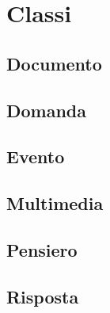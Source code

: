 \chapter{Classi}\label{ch:contenuti:classi}
\section{Documento}
\section{Domanda}
\section{Evento}
\section{Multimedia}
\section{Pensiero}
\section{Risposta}
